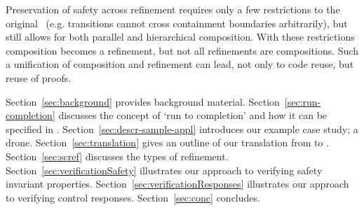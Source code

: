 Preservation of safety across refinement requires only a few restrictions to the original~\cite{Harel} \SCs (e.g. transitions cannot
cross containment boundaries arbitrarily), but still allows for both parallel and hierarchical composition. 
With these restrictions composition becomes a refinement, but not all refinements are compositions.  
Such a unification of composition and refinement can lead, not only to code reuse, but reuse of proofs.

Section~\ref{sec:background} provides background material. Section~\ref{sec:run-completion} discusses the \SC concept of `run to completion' and how it can be specified in \EventB. Section~\ref{sec:descr-sample-appl} introduces our example case study; a drone. Section~\ref{sec:translation} gives an outline of our translation from \SCXML to \EventB. Section~\ref{sec:scref} discusses the types of refinement. Section~\ref{sec:verificationSafety} illustrates our approach to verifying safety invariant properties. Section~\ref{sec:verificationResponses} illustrates our approach to verifying control responses. Section~\ref{sec:conc} concludes.




